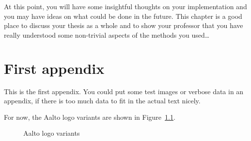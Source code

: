 \documentclass[12pt,a4paper,oneside,pdftex]{report}
\begin{document}
At this point, you will have some insightful thoughts on your implementation
and you may have ideas on what could be done in the future.
This chapter is a good place to discuss your thesis as a whole and to show your
professor that you have really understood some non-trivial aspects of the
methods you used\ldots



% 




% 



\appendix
% 

\chapter{First appendix}
\label{chapter:first-appendix}

This is the first appendix. You could put some test images or verbose data in an
appendix, if there is too much data to fit in the actual text nicely.

For now, the Aalto logo variants are shown in Figure~\ref{fig:aaltologo}.

\begin{figure}
\begin{center}
\caption{Aalto logo variants}
\label{fig:aaltologo}
\end{center}
\end{figure}


\end{document}
